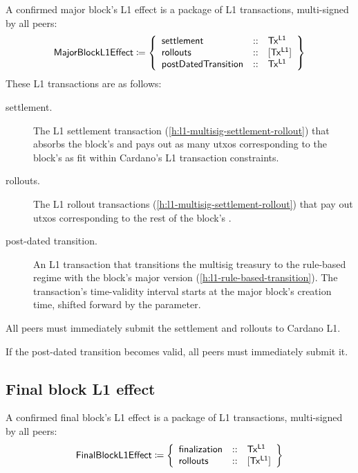 \documentclass[../hydrozoa.tex]{subfiles}
\begin{document}
A confirmed major block's L1 effect is a package of L1 transactions, multi-signed by all peers:
\begin{equation*}
  \mathsf{MajorBlockL1Effect} \coloneq \left\{
  \begin{array}{lll}
    \mathsf{settlement} &::& \mathsf{Tx^{L1}} \\
    \mathsf{rollouts} &::& [\mathsf{Tx^{L1}}] \\
    \mathsf{postDatedTransition} &::& \mathsf{Tx^{L1}}
  \end{array}\right\}
\end{equation*}
These L1 transactions are as follows:
\begin{description}
  \item[settlement.] The L1 settlement transaction (\cref{h:l1-multisig-settlement-rollout}) that absorbs the block's  and pays out as many utxos corresponding to the block's  as fit within Cardano's L1 transaction constraints.
  \item[rollouts.] The L1 rollout transactions (\cref{h:l1-multisig-settlement-rollout}) that pay out utxos corresponding to the rest of the block's .
  \item[post-dated transition.] An L1 transaction that transitions the multisig treasury to the rule-based regime with the block's major version (\cref{h:l1-rule-based-transition}).
    The transaction's time-validity interval starts at the major block's creation time, shifted forward by the  parameter.
\end{description}

All peers must immediately submit the settlement and rollouts to Cardano L1.

If the post-dated transition becomes valid, all peers must immediately submit it.

\subsection{Final block L1 effect}%
\label{h:l2-block-effect-final-block}%

A confirmed final block's L1 effect is a package of L1 transactions, multi-signed by all peers:
\begin{equation*}
  \mathsf{FinalBlockL1Effect} \coloneq \left\{
  \begin{array}{lll}
    \mathsf{finalization} &::& \mathsf{Tx^{L1}} \\
    \mathsf{rollouts} &::& [\mathsf{Tx^{L1}}] \\
  \end{array}\right\}
\end{equation*}
\end{document}
